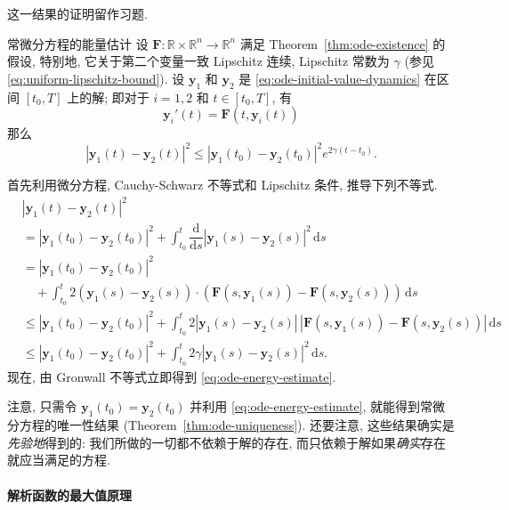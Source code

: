 这一结果的证明留作习题.

\begin{Lemma}{常微分方程的能量估计}
\label{lem:ode-energy-estimate}
设 $\bm{F}:\mathbb{R}\times\mathbb{R}^n\to\mathbb{R}^n$ 满足 Theorem~\ref{thm:ode-existence} 的假设, 特别地, 它关于第二个变量一致 Lipschitz 连续, Lipschitz 常数为 $\gamma$ (参见 \eqref{eq:uniform-lipschitz-bound}). 设 $\bm{y}_1$ 和 $\bm{y}_2$ 是 \eqref{eq:ode-initial-value-dynamics} 在区间 $[t_0,T]$ 上的解; 即对于 $i=1,2$ 和 $t\in[t_0,T]$, 有
\[
\bm{y}_i'(t)=\bm{F}(t,\bm{y}_i(t))
\]
那么
\begin{equation}\label{eq:ode-energy-estimate}
|\bm{y}_1(t)-\bm{y}_2(t)|^2\leq|\bm{y}_1(t_0)-\bm{y}_2(t_0)|^2e^{2\gamma(t-t_0)}.
\end{equation}

\end{Lemma}

\begin{Proof}
首先利用微分方程, Cauchy-Schwarz 不等式和 Lipschitz 条件, 推导下列不等式.
\[
\begin{aligned}
&|\bm{y}_1(t)-\bm{y}_2(t)|^2\\
&=|\bm{y}_1(t_0)-\bm{y}_2(t_0)|^2+\int_{t_0}^t\dfrac{\mathrm{d}}{\mathrm{d}s}|\bm{y}_1(s)-\bm{y}_2(s)|^2\,\mathrm{d}s\\
&=|\bm{y}_1(t_0)-\bm{y}_2(t_0)|^2\\
&\quad+\int_{t_0}^t2(\bm{y}_1(s)-\bm{y}_2(s))\cdot(\bm{F}(s,\bm{y}_1(s))-\bm{F}(s,\bm{y}_2(s)))\,\mathrm{d}s\\
&\leq|\bm{y}_1(t_0)-\bm{y}_2(t_0)|^2+\int_{t_0}^t2|\bm{y}_1(s)-\bm{y}_2(s)|\,|\bm{F}(s,\bm{y}_1(s))-\bm{F}(s,\bm{y}_2(s))|\,\mathrm{d}s\\
&\leq|\bm{y}_1(t_0)-\bm{y}_2(t_0)|^2+\int_{t_0}^t2\gamma|\bm{y}_1(s)-\bm{y}_2(s)|^2\,\mathrm{d}s.
\end{aligned}
\]
现在, 由 Gronwall 不等式立即得到 \eqref{eq:ode-energy-estimate}.
\end{Proof}

注意, 只需令 $\bm{y}_1(t_0)=\bm{y}_2(t_0)$ 并利用 \eqref{eq:ode-energy-estimate}, 就能得到常微分方程的唯一性结果 (Theorem~\ref{thm:ode-uniqueness}). 还要注意, 这些结果确实是\emph{先验地}得到的: 我们所做的一切都不依赖于解的存在, 而只依赖于解如果\emph{确实}存在就应当满足的方程.

\paragraph*{解析函数的最大值原理}

